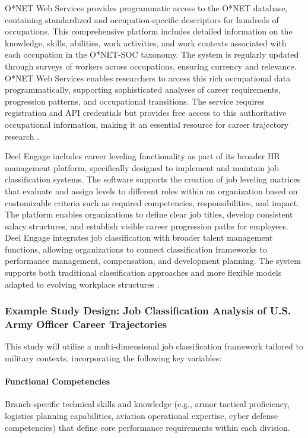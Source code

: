 \documentclass[../main.tex]{subfiles}
\begin{document}
O*NET Web Services provides programmatic access to the O*NET database, containing standardized and occupation-specific descriptors for hundreds of occupations. This comprehensive platform includes detailed information on the knowledge, skills, abilities, work activities, and work contexts associated with each occupation in the O*NET-SOC taxonomy. The system is regularly updated through surveys of workers across occupations, ensuring currency and relevance. O*NET Web Services enables researchers to access this rich occupational data programmatically, supporting sophisticated analyses of career requirements, progression patterns, and occupational transitions. The service requires registration and API credentials but provides free access to this authoritative occupational information, making it an essential resource for career trajectory research \cite{onet2024, onetonline2024}.

Deel Engage includes career leveling functionality as part of its broader HR management platform, specifically designed to implement and maintain job classification systems. The software supports the creation of job leveling matrices that evaluate and assign levels to different roles within an organization based on customizable criteria such as required competencies, responsibilities, and impact. The platform enables organizations to define clear job titles, develop consistent salary structures, and establish visible career progression paths for employees. Deel Engage integrates job classification with broader talent management functions, allowing organizations to connect classification frameworks to performance management, compensation, and development planning. The system supports both traditional classification approaches and more flexible models adapted to evolving workplace structures \cite{deel2024}.

\subsubsection{Example Study Design: Job Classification Analysis of U.S. Army Officer Career Trajectories}

This study will utilize a multi-dimensional job classification framework tailored to military contexts, incorporating the following key variables:

\paragraph{Functional Competencies} Branch-specific technical skills and knowledge (e.g., armor tactical proficiency, logistics planning capabilities, aviation operational expertise, cyber defense competencies) that define core performance requirements within each division.
\end{document}
